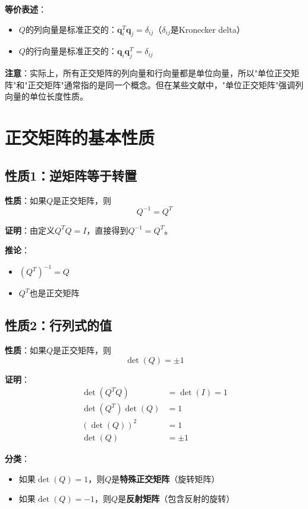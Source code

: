 \documentclass[12pt,a4paper]{article}
\begin{document}
\textbf{等价表述}：
\begin{itemize}
\item $Q$的列向量是标准正交的：$\bm{q}_i^T \bm{q}_j = \delta_{ij}$（$\delta_{ij}$是Kronecker delta）
\item $Q$的行向量是标准正交的：$\bm{q}_i \bm{q}_j^T = \delta_{ij}$
\end{itemize}

\textbf{注意}：实际上，所有正交矩阵的列向量和行向量都是单位向量，所以"单位正交矩阵"和"正交矩阵"通常指的是同一个概念。但在某些文献中，"单位正交矩阵"强调列向量的单位长度性质。

\section{正交矩阵的基本性质}

\subsection{性质1：逆矩阵等于转置}

\textbf{性质}：如果$Q$是正交矩阵，则
\begin{equation}
Q^{-1} = Q^T
\label{eq:inverse_transpose}
\end{equation}

\textbf{证明}：由定义$Q^T Q = I$，直接得到$Q^{-1} = Q^T$。

\textbf{推论}：
\begin{itemize}
\item $(Q^T)^{-1} = Q$
\item $Q^T$也是正交矩阵
\end{itemize}

\subsection{性质2：行列式的值}

\textbf{性质}：如果$Q$是正交矩阵，则
\begin{equation}
\det(Q) = \pm 1
\label{eq:determinant}
\end{equation}

\textbf{证明}：
\begin{align}
\det(Q^T Q) &= \det(I) = 1 \\
\det(Q^T) \det(Q) &= 1 \\
(\det(Q))^2 &= 1 \\
\det(Q) &= \pm 1
\end{align}

\textbf{分类}：
\begin{itemize}
\item 如果$\det(Q) = 1$，则$Q$是\textbf{特殊正交矩阵}（旋转矩阵）
\item 如果$\det(Q) = -1$，则$Q$是\textbf{反射矩阵}（包含反射的旋转）
\end{itemize}
\end{document}
